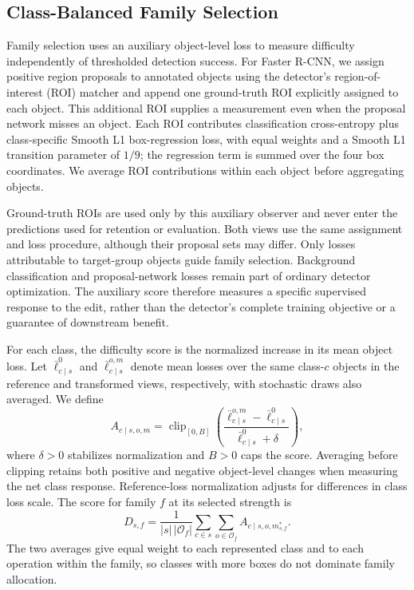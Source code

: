 \documentclass[conference]{IEEEtran}
\begin{document}
\subsection{Class-Balanced Family Selection}
\label{sec:method_allocation}
Family selection uses an auxiliary object-level loss to measure difficulty independently of thresholded detection success. For Faster R-CNN, we assign positive region proposals to annotated objects using the detector's region-of-interest (ROI) matcher and append one ground-truth ROI explicitly assigned to each object. This additional ROI supplies a measurement even when the proposal network misses an object. Each ROI contributes classification cross-entropy plus class-specific Smooth L1 box-regression loss, with equal weights and a Smooth L1 transition parameter of $1/9$; the regression term is summed over the four box coordinates. We average ROI contributions within each object before aggregating objects.

Ground-truth ROIs are used only by this auxiliary observer and never enter the predictions used for retention or evaluation. Both views use the same assignment and loss procedure, although their proposal sets may differ. Only losses attributable to target-group objects guide family selection. Background classification and proposal-network losses remain part of ordinary detector optimization. The auxiliary score therefore measures a specific supervised response to the edit, rather than the detector's complete training objective or a guarantee of downstream benefit.

For each class, the difficulty score is the normalized increase in its mean object loss. Let $\bar\ell^0_{c\mid s}$ and $\bar\ell^{o,m}_{c\mid s}$ denote mean losses over the same class-$c$ objects in the reference and transformed views, respectively, with stochastic draws also averaged. We define
\begin{equation}
 A_{c\mid s,o,m}=\operatorname{clip}_{[0,B]}
 \left(\frac{\bar\ell^{o,m}_{c\mid s}-\bar\ell^0_{c\mid s}}
 {\bar\ell^0_{c\mid s}+\delta}\right),
 \label{eq:class_difficulty}
\end{equation}
where $\delta>0$ stabilizes normalization and $B>0$ caps the score. Averaging before clipping retains both positive and negative object-level changes when measuring the net class response. Reference-loss normalization adjusts for differences in class loss scale. The score for family $f$ at its selected strength is
\begin{equation}
 D_{s,f}=\frac{1}{|s|\,|\mathcal{O}_f|}
 \sum_{c\in s}\sum_{o\in\mathcal{O}_f}
 A_{c\mid s,o,m^*_{s,f}}.
 \label{eq:family_score}
\end{equation}
The two averages give equal weight to each represented class and to each operation within the family, so classes with more boxes do not dominate family allocation.
\end{document}
